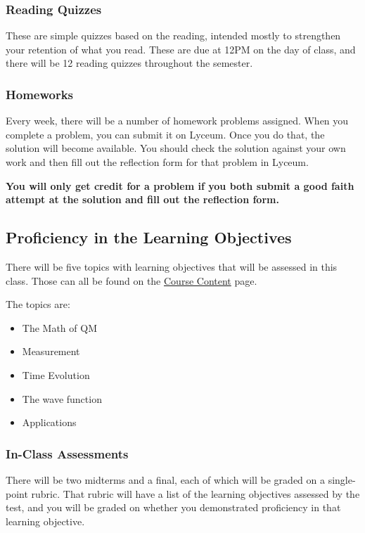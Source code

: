 \documentclass[
  letterpaper,
  DIV=11,
  numbers=noendperiod]{scrartcl}
\providecommand{\tightlist}{%
  \setlength{\itemsep}{0pt}\setlength{\parskip}{0pt}}
\begin{document}
\subsubsection{Reading Quizzes}

These are simple quizzes based on the reading, intended mostly to
strengthen your retention of what you read. These are due at 12PM on the
day of class, and there will be 12 reading quizzes throughout the
semester.

\subsubsection{Homeworks}

Every week, there will be a number of homework problems assigned. When
you complete a problem, you can submit it on Lyceum. Once you do that,
the solution will become available. You should check the solution
against your own work and then fill out the reflection form for that
problem in Lyceum.

\textbf{You will only get credit for a problem if you both submit a good
faith attempt at the solution and fill out the reflection form.}

\subsection{Proficiency in the Learning Objectives}\label{LOgrade}

There will be five topics with learning objectives that will be assessed
in this class. Those can all be found on the
\href{coursecontent.qmd}{Course Content} page.

The topics are:

\begin{itemize}
\tightlist
\item
  The Math of QM
\item
  Measurement
\item
  Time Evolution
\item
  The wave function
\item
  Applications
\end{itemize}

\subsubsection{In-Class Assessments}\label{assessments}

There will be two midterms and a final, each of which will be graded on
a single-point rubric. That rubric will have a list of the learning
objectives assessed by the test, and you will be graded on whether you
demonstrated proficiency in that learning objective.
\end{document}
